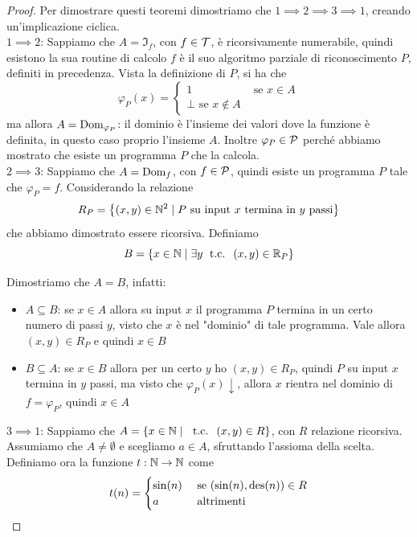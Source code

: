 \begin{proof}
	Per dimostrare questi teoremi dimostriamo che $1 \implies 2 \implies 3 \implies 1$, creando un'implicazione ciclica.\\
	
	$1 \implies 2$: Sappiamo che $A = \Im_f$, con $f \in \mathcal{T}$, è ricorsivamente numerabile, quindi esistono la sua routine di calcolo $f$ è il suo algoritmo parziale di riconoscimento $P$, definiti in precedenza. Vista la definizione di $P$, si ha che
	$$ 
	\varphi_P (x) = \begin{cases}
		1 & \text{ se } x \in A \\
		\bot \text{ se } x \notin A
	\end{cases}
	$$
	ma allora $A = \text{Dom}_{\varphi_P}$: il dominio è l'insieme dei valori dove la funzione è definita, in questo caso proprio l'insieme $A$. Inoltre $\varphi_P \in \mathcal{P}$ perché abbiamo mostrato che esiste un programma $P$ che la calcola.\\
	
	$2 \implies 3$: Sappiamo che $A = \text{Dom}_f$, con $f \in \mathcal{P}$, quindi esiste un programma $P$ tale che $\varphi_P = f$. Considerando la relazione
	$$ R_P = \left\{(x,y) \in \mathbb{N}^2 \mid P \text{ su input } x \text{ termina in } y \text{ passi}\right\}$$
	che abbiamo dimostrato essere ricorsiva. Definiamo 
	$$ B = \left\{x \in \mathbb{N} \mid \exists y \; \text{ t.c. } \; (x,y) \in \mathbb{R}_P \right\} $$
	
	Dimostriamo che $A=B$, infatti:
	\begin{itemize}
		\item $A \subseteq B$: se $x \in A$ allora su input $x$ il programma $P$ termina in un certo numero di passi $y$, visto che $x$ è nel "dominio" di tale programma. Vale allora $(x,y) \in R_P$ e quindi $x \in B$
		\item $B \subseteq A$: se $x \in B$ allora per un certo $y$ ho $(x,y) \in R_P$, quindi $P$ su input $x$ termina in $y$ passi, ma visto che $\varphi_P (x) \downarrow$, allora $x$ rientra nel dominio di $f = \varphi_P$, quindi $x \in A$
	\end{itemize}
	
	$3 \implies 1$: Sappiamo che $A = \left\{x \in \mathbb{N} \mid \; \text{ t.c. } \; (x,y) \in R\right\}$, con $R$ relazione ricorsiva. \\
	
	Assumiamo che $A \neq \emptyset$ e scegliamo $a \in A$, sfruttando l'assioma della scelta. Definiamo ora la funzione $t: \mathbb{N} \rightarrow \mathbb{N}$ come
	$$ 
	t(n) = \begin{cases}
		\sin (n) & \text{ se } (\sin(n), \operatorname{des}(n)) \in R \\
		a & \text{ altrimenti}
	\end{cases}
	$$
	

\end{proof}
